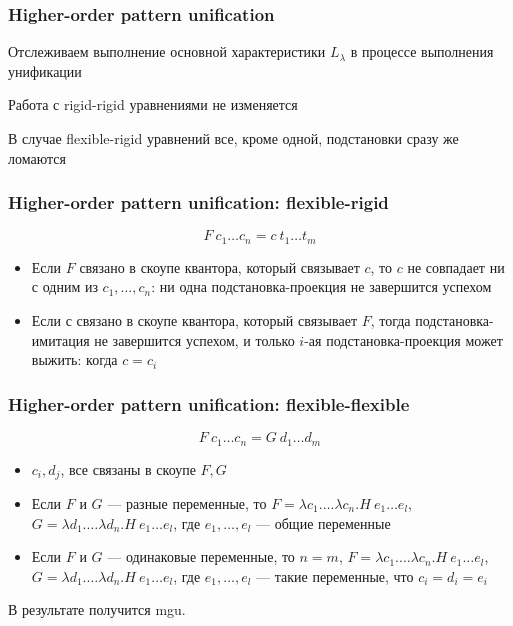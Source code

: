 \documentclass{beamer}
\begin{document}
\begin{frame}[fragile]
  \frametitle{Higher-order pattern unification}
Отслеживаем выполнение основной характеристики $L_{\lambda}$ в процессе выполнения унификации

\vspace{1cm}

Работа с rigid-rigid уравнениями не изменяется

\vspace{1cm}

В случае flexible-rigid уравнений все, кроме одной, подстановки сразу же ломаются

\end{frame}

\begin{frame}[fragile]
  \frametitle{Higher-order pattern unification: flexible-rigid}
\[ F \ c_1 \dots c_n = c \ t_1 \dots t_m \]

\begin{itemize}
  \item Если $F$ связано в скоупе квантора, который связывает $c$, то $c$ не совпадает ни с одним из $c_1, \dots, c_n$: ни одна подстановка-проекция не завершится успехом
  \item Если $с$ связано в скоупе квантора, который связывает $F$, тогда подстановка-имитация не завершится успехом, и только $i$-ая подстановка-проекция может выжить: когда $c = c_i$
\end{itemize}

\end{frame}

\begin{frame}[fragile]
  \frametitle{Higher-order pattern unification: flexible-flexible}
\[ F \ c_1 \dots c_n = G \ d_1 \dots d_m \]

\begin{itemize}
  \item $c_i, d_j$, все связаны в скоупе $F, G$
  \item Если $F$ и $G$ --- разные переменные, то $F = \lambda c_1. \dots \lambda c_n. H \ e_1 \dots e_l$, $G = \lambda d_1. \dots \lambda d_n. H \ e_1 \dots e_l$, где $e_1, \dots, e_l$ --- общие переменные
  \item Если $F$ и $G$ --- одинаковые переменные, то $n = m$, $F = \lambda c_1. \dots \lambda c_n. H \ e_1 \dots e_l$, $G = \lambda d_1. \dots \lambda d_n. H \ e_1 \dots e_l$, где $e_1, \dots, e_l$ --- такие переменные, что $c_i = d_i = e_i$
\end{itemize}

В результате получится mgu.
\end{frame}
\end{document}
